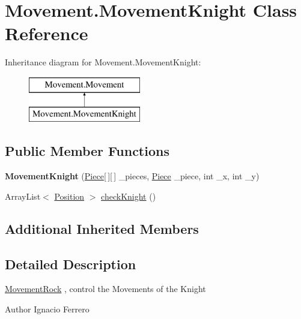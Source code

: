 \hypertarget{class_movement_1_1_movement_knight}{\section{Movement.\-Movement\-Knight Class Reference}
\label{class_movement_1_1_movement_knight}
}
Inheritance diagram for Movement.\-Movement\-Knight\-:\begin{figure}[H]
\begin{center}
\leavevmode
\includegraphics[height=2.000000cm]{class_movement_1_1_movement_knight}
\end{center}
\end{figure}
\subsection*{Public Member Functions}
\begin{DoxyCompactItemize}
\item 
\hypertarget{class_movement_1_1_movement_knight_afa9d052ef6a838d188f1a0a0468fc44c}{{\bfseries Movement\-Knight} (\hyperlink{class_basic___objects_1_1_piece}{Piece}\mbox{[}$\,$\mbox{]}\mbox{[}$\,$\mbox{]} \-\_\-pieces, \hyperlink{class_basic___objects_1_1_piece}{Piece} \-\_\-piece, int \-\_\-x, int \-\_\-y)}\label{class_movement_1_1_movement_knight_afa9d052ef6a838d188f1a0a0468fc44c}

\item 
Array\-List$<$ \hyperlink{class_basic___objects_1_1_position}{Position} $>$ \hyperlink{class_movement_1_1_movement_knight_aa8d179cb6c161d45aa173985d67ade65}{check\-Knight} ()
\end{DoxyCompactItemize}
\subsection*{Additional Inherited Members}


\subsection{Detailed Description}
\hyperlink{class_movement_1_1_movement_rock}{Movement\-Rock} , control the Movements of the Knight \begin{DoxyAuthor}{Author}
Ignacio Ferrero 
\end{DoxyAuthor}


